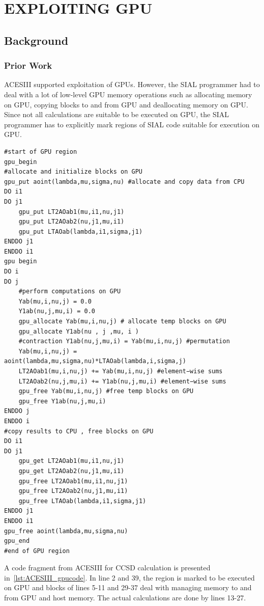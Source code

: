 \chapter{EXPLOITING GPU}\label{exploitinggpu}
\section{Background}
\subsection{Prior Work}
ACESIII supported exploitation of GPUs. However, the SIAL programmer had to deal
with a lot of low-level GPU memory operations such as allocating memory on GPU,
copying blocks to and from GPU and deallocating memory on GPU. Since not all
calculations are suitable to be executed on GPU, the SIAL programmer has to explicitly mark
regions of SIAL code suitable for execution on GPU.

\begin{lstlisting}[caption={Code Fragment from ACESIII for CCSD calculation},
  label={lst:ACESIII_gpucode}]
#start of GPU region
gpu_begin
#allocate and initialize blocks on GPU
gpu_put aoint(lambda,mu,sigma,nu) #allocate and copy data from CPU
DO i1
DO j1
    gpu_put LT2AOab1(mu,i1,nu,j1)
    gpu_put LT2AOab2(nu,j1,mu,i1)
    gpu_put LTAOab(lambda,i1,sigma,j1)
ENDDO j1
ENDDO i1
gpu begin
DO i
DO j
    #perform computations on GPU
    Yab(mu,i,nu,j) = 0.0
    Y1ab(nu,j,mu,i) = 0.0
    gpu_allocate Yab(mu,i,nu,j) # allocate temp blocks on GPU
    gpu_allocate Y1ab(nu , j ,mu, i )
    #contraction Y1ab(nu,j,mu,i) = Yab(mu,i,nu,j) #permutation
    Yab(mu,i,nu,j) = aoint(lambda,mu,sigma,nu)*LTAOab(lambda,i,sigma,j)
    LT2AOab1(mu,i,nu,j) += Yab(mu,i,nu,j) #element−wise sums
    LT2AOab2(nu,j,mu,i) += Y1ab(nu,j,mu,i) #element−wise sums
    gpu_free Yab(mu,i,nu,j) #free temp blocks on GPU
    gpu_free Y1ab(nu,j,mu,i)
ENDDO j
ENDDO i
#copy results to CPU , free blocks on GPU
DO i1
DO j1
    gpu_get LT2AOab1(mu,i1,nu,j1)
    gpu_get LT2AOab2(nu,j1,mu,i1)
    gpu_free LT2AOab1(mu,i1,nu,j1)
    gpu_free LT2AOab2(nu,j1,mu,i1)
    gpu_free LTAOab(lambda,i1,sigma,j1)
ENDDO j1
ENDDO i1
gpu_free aoint(lambda,mu,sigma,nu)
gpu_end
#end of GPU region
\end{lstlisting}

A code fragment from ACESIII for CCSD calculation is presented
in~\ref{lst:ACESIII_gpucode}. In line 2 and 39, the region is marked to be executed
on GPU and blocks of lines 5-11 and 29-37 deal with managing memory to and from
GPU and host memory. The actual calculations are done by lines 13-27.

